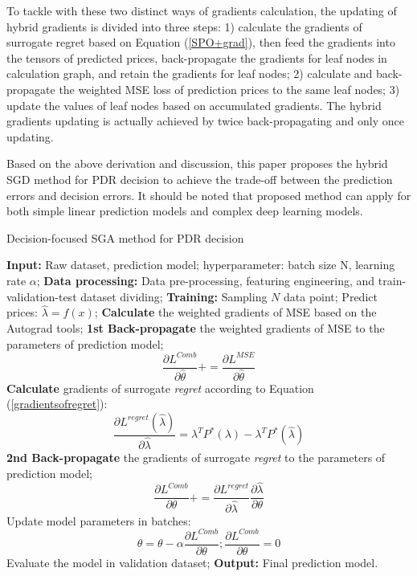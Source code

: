 \documentclass[journal]{IEEEtran}
\begin{document}
To tackle with these two distinct ways of gradients calculation, the updating of hybrid gradients is divided into three steps: 1) calculate the gradients of surrogate regret based on Equation (\ref{SPO+grad}), then feed the gradients into the tensors of predicted prices, back-propagate the gradients for leaf nodes in calculation graph, and retain the gradients for leaf nodes; 2) calculate and back-propagate the weighted MSE loss of prediction prices to the same leaf nodes; 3) update the values of leaf nodes based on accumulated gradients. The hybrid gradients updating is actually achieved by twice back-propagating and only once updating.

Based on the above derivation and discussion, this paper proposes the hybrid SGD method for PDR decision to achieve the trade-off between the prediction errors and decision errors. It should be noted that proposed method can apply for both simple linear prediction models and complex deep learning models.

\begin{algorithm}[!t]
  \label{CombSGD}
  \caption{Decision-focused SGA method for PDR decision}
  {\small{
    \begin{algorithmic}[1]
      \STATE \textbf{Input:} Raw dataset, prediction model; hyperparameter: batch size N, learning rate $\alpha$;
      \STATE \textbf{Data processing:} Data pre-processing, featuring engineering, and train-validation-test dataset dividing; 
      \STATE \textbf{Training:}
      \STATE Sampling $N$ data point; 
      \STATE Predict prices: $\hat{\lambda} = f(x)$;
      \STATE \textbf{Calculate} the weighted gradients of MSE based on the Autograd tools;
      \STATE \textbf{1st Back-propagate} the weighted gradients of MSE to the parameters of prediction model; $$\frac{\partial L^{Comb}}{\partial \hat{\theta}} += \frac{\partial L^{MSE}}{\partial \hat{\theta}}$$
      \STATE \textbf{Calculate} gradients of surrogate \textit{regret} according to Equation (\ref{gradientsofregret}): $$\frac{\partial L^{regret}(\hat{\lambda}) }{\partial \hat{\lambda}} =  \lambda^T P^*(\lambda) - \lambda^T P^*(\hat{\lambda})$$
      \STATE \textbf{2nd Back-propagate} the gradients of surrogate \textit{regret} to the parameters of prediction model;$$\frac{\partial L^{Comb}}{\partial \theta} += \frac{\partial L^{regret}}{\partial \hat{\lambda}} \frac{\partial \hat{\lambda}}{\partial \theta}$$
      \ENDFOR
      \STATE Update model parameters in batches: $$\theta = \theta - \alpha \frac{\partial L^{Comb}}{\partial \theta}; \frac{\partial L^{Comb}}{\partial \theta} = 0$$
      \STATE Evaluate the model in validation dataset;
      \ENDWHILE 
      \STATE \textbf{Output:} Final prediction model.
    \end{algorithmic}
  }}
\end{algorithm}
\end{document}

